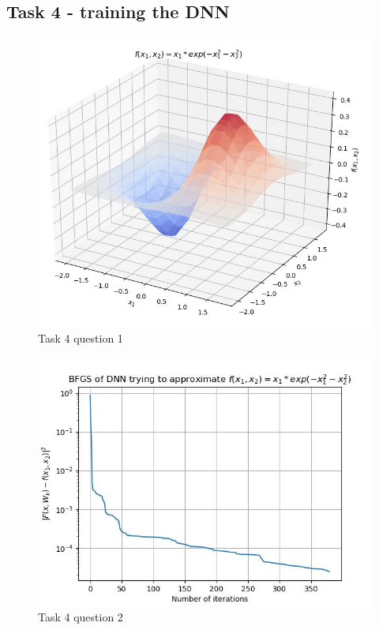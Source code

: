 \documentclass[12pt]{scrartcl}
\begin{document}
\subsection*{Task 4 - training the DNN}
\begin{figure}[ht!]
	\hfill\includegraphics[width=\linewidth]{target_fun_3d_plot.jpg}\hspace*{\fill}
	\caption{Task 4 question 1}
\end{figure}

\begin{figure}[ht!]
	\hfill\includegraphics[width=\linewidth]{bfgs_of_dnn.jpg}\hspace*{\fill}
	\caption{Task 4 question 2}
\end{figure}
\end{document}

